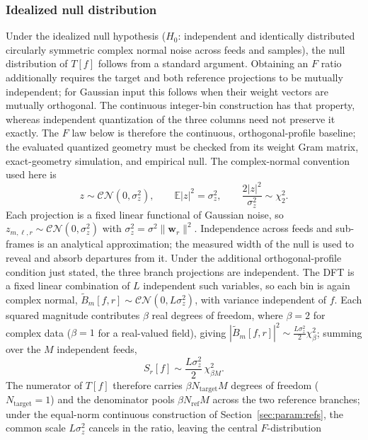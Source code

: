 \subsubsection*{Idealized null distribution}
Under the idealized null hypothesis ($H_0$: independent and identically distributed circularly symmetric complex normal noise across feeds and samples), the null distribution of $T[f]$ follows from a standard argument.  Obtaining an $F$ ratio additionally requires the target and both reference projections to be mutually independent; for Gaussian input this follows when their weight vectors are mutually orthogonal. The continuous integer-bin construction has that property, whereas independent quantization of the three columns need not preserve it exactly. The $F$ law below is therefore the continuous, orthogonal-profile baseline; the evaluated quantized geometry must be checked from its weight Gram matrix, exact-geometry simulation, and empirical null. The complex-normal convention used here is
\begin{equation}
z \sim \mathcal{CN}(0,\sigma_z^2), \qquad
\mathbb{E}|z|^2=\sigma_z^2, \qquad
\frac{2|z|^2}{\sigma_z^2}\sim\chi_2^2.
\label{eq:pipeline:cnconv}
\end{equation}
Each projection is a fixed linear functional of Gaussian noise, so $z_{m,\ell,r} \sim \mathcal{CN}(0, \sigma_z^2)$ with $\sigma_z^2 = \sigma^2 \|\mathbf{w}_r\|^2$.  Independence across feeds and sub-frames is an analytical approximation; the measured width of the null is used to reveal and absorb departures from it. Under the additional orthogonal-profile condition just stated, the three branch projections are independent. The DFT is a fixed linear combination of $L$ independent such variables, so each bin is again complex normal, $\widetilde{B}_m[f,r] \sim \mathcal{CN}(0, L \sigma_z^2)$, with variance independent of $f$. Each squared magnitude contributes $\beta$ real degrees of freedom, where $\beta = 2$ for complex data ($\beta = 1$ for a real-valued field), giving $|\widetilde{B}_m[f,r]|^2 \sim \tfrac{L\sigma_z^2}{2} \chi^2_{\beta}$; summing over the $M$ independent feeds,
\begin{equation}
S_r[f] \sim \frac{L \sigma_z^2}{2} \, \chi^2_{\beta M}.
\end{equation}
The numerator of $T[f]$ therefore carries $\beta N_{\text{target}} M$ degrees of freedom ($N_{\text{target}} = 1$) and the denominator pools $\beta N_{\text{ref}} M$ across the two reference branches; under the equal-norm continuous construction of Section~\ref{sec:param:refs}, the common scale $L\sigma_z^2$ cancels in the ratio, leaving the central $F$-distribution
